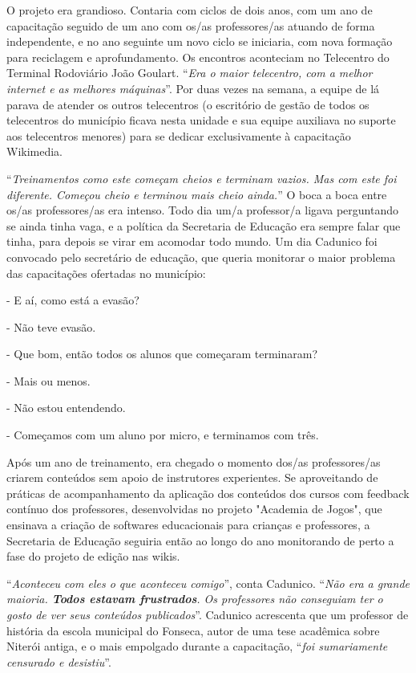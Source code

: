 O projeto era grandioso. Contaria com ciclos de dois anos, com um ano de capacitação seguido de um ano com os/as professores/as atuando de forma independente, e no ano seguinte um novo ciclo se iniciaria, com nova formação para reciclagem e aprofundamento. Os encontros aconteciam no Telecentro do Terminal Rodoviário João Goulart. ``\textit{Era o maior telecentro, com a melhor internet e as melhores máquinas}''. Por duas vezes na semana, a equipe de lá parava de atender os outros telecentros (o escritório de gestão de todos os telecentros do município ficava nesta unidade e sua equipe auxiliava no suporte aos telecentros menores) para se dedicar exclusivamente à capacitação Wikimedia.

``\textit{Treinamentos como este começam cheios e terminam vazios. Mas com este foi diferente. Começou cheio e terminou mais cheio ainda.}'' O boca a boca entre os/as professores/as era intenso. Todo dia um/a professor/a ligava perguntando se ainda tinha vaga, e a política da Secretaria de Educação era sempre falar que tinha, para depois se virar em acomodar todo mundo. Um dia Cadunico foi convocado pelo secretário de educação, que queria monitorar o maior problema das capacitações ofertadas no município:

- E aí, como está a evasão?

- Não teve evasão.

- Que bom, então todos os alunos que começaram terminaram?

- Mais ou menos.

- Não estou entendendo.

- Começamos com um aluno por micro, e terminamos com três.

Após um ano de treinamento, era chegado o momento dos/as professores/as criarem conteúdos sem apoio de instrutores experientes. Se aproveitando de práticas de acompanhamento da aplicação dos conteúdos dos cursos com feedback contínuo dos professores, desenvolvidas no projeto "Academia de Jogos", que ensinava a criação de softwares educacionais para crianças e professores, a Secretaria de Educação seguiria então ao longo do ano monitorando de perto a fase do projeto de edição nas wikis.

``\textit{Aconteceu com eles o que aconteceu comigo}'', conta Cadunico. ``\textit{Não era a grande maioria. \textbf{Todos estavam frustrados}. Os professores não conseguiam ter o gosto de ver seus conteúdos publicados}''. Cadunico acrescenta que um professor de história da escola municipal do Fonseca, autor de uma tese acadêmica sobre Niterói antiga, e o mais empolgado durante a capacitação, ``\textit{foi sumariamente censurado e desistiu}''.

